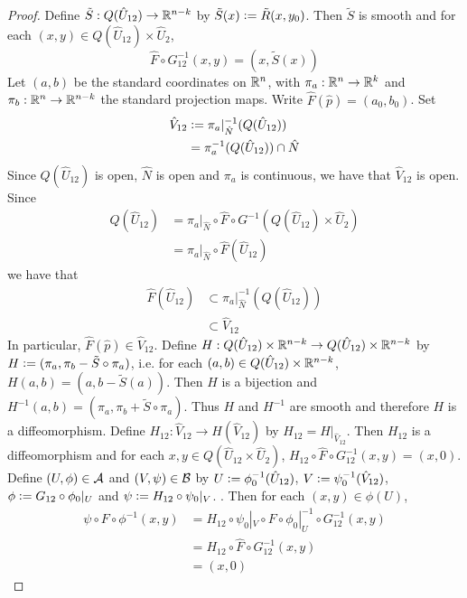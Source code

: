 \documentclass{book}
\begin{document}
\begin{proof}
		Define $\tilde{S}: Q(\hat{U}_{12}) \rightarrow \mathbb{R}^{n-k}$ by $\tilde{S}(x) \vcentcolon= \tilde{R}(x, y_0)$. Then $\tilde{S}$ is smooth and for each $(x,y) \in Q(\hat{U}_{12}) \times \hat{U}_2$, 
		$$\hat{F} \circ G_{12}^{-1}(x,y) = (x, \tilde{S}(x))$$
		Let $(a, b)$ be the standard coordinates on $\mathbb{R}^n$, with $\pi_a: \mathbb{R}^n \rightarrow \mathbb{R}^k$ and $\pi_b: \mathbb{R}^n \rightarrow \mathbb{R}^{n-k}$ the standard projection maps. Write $\hat{F}(\hat{p}) = (a_0, b_0)$. Set 
		\begin{align*}
		 	\hat{V}_{12}
		 	& \vcentcolon= \pi_a|_{\hat{N}}^{-1}(Q(\hat{U}_{12})) \\
		 	& = \pi_a^{-1}(Q(\hat{U}_{12})) \cap \hat{N} 
		\end{align*}
		Since $Q(\hat{U}_{12})$ is open, $\hat{N}$ is open and $\pi_a$ is continuous, we have that $\hat{V}_{12}$ is open. Since 
		\begin{align*}
			Q(\hat{U}_{12})
		 	& = \pi_a|_{\hat{N}} \circ \hat{F} \circ G^{-1} (Q(\hat{U}_{12})  \times \hat{U}_2) \\
		 	& = \pi_a|_{\hat{N}} \circ \hat{F} (\hat{U}_{12})
		\end{align*}
	 	we have that 
	 	\begin{align*}
	 		\hat{F} (\hat{U}_{12}) 
	 		& \subset \pi_a|_{\hat{N}}^{-1}(Q(\hat{U}_{12})) \\
	 		& \subset \hat{V}_{12}
	 	\end{align*}
	 	In particular, $\hat{F}(\hat{p}) \in \hat{V}_{12}$. Define $H: Q(\hat{U}_{12}) \times \mathbb{R}^{n-k} \rightarrow Q(\hat{U}_{12}) \times \mathbb{R}^{n-k}$ by $H \vcentcolon= (\pi_a, \pi_b - \tilde{S} \circ \pi_a)$, i.e. for each $(a,b) \in Q(\hat{U}_{12}) \times \mathbb{R}^{n-k}$, $H(a,b) = (a, b-\tilde{S}(a))$. Then $H$ is a bijection and $H^{-1}(a,b) = (\pi_a, \pi_b + \tilde{S} \circ \pi_a)$. Thus $H$ and $H^{-1}$ are smooth and therefore $H$ is a diffeomorphism. Define $H_{12}: \hat{V}_{12} \rightarrow H(\hat{V}_{12})$ by 
	 	$H_{12} = H|_{\hat{V}_{12}}$. Then $H_{12}$ is a diffeomorphism and for each $x,y \in Q(\hat{U}_{12} \times \hat{U}_{2})$, $H_{12} \circ \hat{F} \circ G_{12}^{-1}(x, y) = (x, 0)$. Define $(U, \phi) \in \mathcal{A}$ and $(V, \psi) \in \mathcal{B}$ by $U \vcentcolon= \phi_0^{-1}(\hat{U}_{12})$, $V \vcentcolon= \psi_0^{-1}(\hat{V}_{12})$, $\phi \vcentcolon= G_{12} \circ \phi_0|_{U}$ and $\psi \vcentcolon= H_{12} \circ \psi_0|_V$. . Then for each $(x,y) \in \phi(U)$,
	 	\begin{align*}
	 		\psi \circ F \circ \phi^{-1}(x, y)
	 		& = H_{12} \circ \psi_0|_V \circ F \circ \phi_0|_U^{-1} \circ G_{12}^{-1} (x,y) \\
	 		& = H_{12} \circ \hat{F} \circ G_{12}^{-1}(x,y) \\
	 		& = (x, 0)
	 	\end{align*}
	\end{proof}
\end{document}
